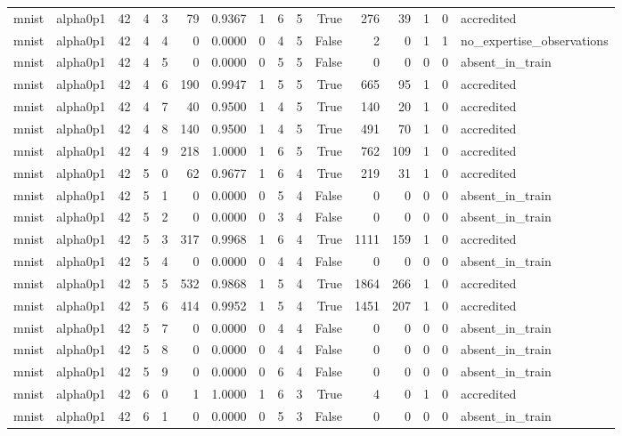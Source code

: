 \begin{tabular}{llrrrrrrrrrrrrrl}
mnist & alpha0p1 & 42 & 4 & 3 & 79 & 0.9367 & 1 & 6 & 5 & True & 276 & 39 & 1 & 0 & accredited \\
mnist & alpha0p1 & 42 & 4 & 4 & 0 & 0.0000 & 0 & 4 & 5 & False & 2 & 0 & 1 & 1 & no\_expertise\_observations \\
mnist & alpha0p1 & 42 & 4 & 5 & 0 & 0.0000 & 0 & 5 & 5 & False & 0 & 0 & 0 & 0 & absent\_in\_train \\
mnist & alpha0p1 & 42 & 4 & 6 & 190 & 0.9947 & 1 & 5 & 5 & True & 665 & 95 & 1 & 0 & accredited \\
mnist & alpha0p1 & 42 & 4 & 7 & 40 & 0.9500 & 1 & 4 & 5 & True & 140 & 20 & 1 & 0 & accredited \\
mnist & alpha0p1 & 42 & 4 & 8 & 140 & 0.9500 & 1 & 4 & 5 & True & 491 & 70 & 1 & 0 & accredited \\
mnist & alpha0p1 & 42 & 4 & 9 & 218 & 1.0000 & 1 & 6 & 5 & True & 762 & 109 & 1 & 0 & accredited \\
mnist & alpha0p1 & 42 & 5 & 0 & 62 & 0.9677 & 1 & 6 & 4 & True & 219 & 31 & 1 & 0 & accredited \\
mnist & alpha0p1 & 42 & 5 & 1 & 0 & 0.0000 & 0 & 5 & 4 & False & 0 & 0 & 0 & 0 & absent\_in\_train \\
mnist & alpha0p1 & 42 & 5 & 2 & 0 & 0.0000 & 0 & 3 & 4 & False & 0 & 0 & 0 & 0 & absent\_in\_train \\
mnist & alpha0p1 & 42 & 5 & 3 & 317 & 0.9968 & 1 & 6 & 4 & True & 1111 & 159 & 1 & 0 & accredited \\
mnist & alpha0p1 & 42 & 5 & 4 & 0 & 0.0000 & 0 & 4 & 4 & False & 0 & 0 & 0 & 0 & absent\_in\_train \\
mnist & alpha0p1 & 42 & 5 & 5 & 532 & 0.9868 & 1 & 5 & 4 & True & 1864 & 266 & 1 & 0 & accredited \\
mnist & alpha0p1 & 42 & 5 & 6 & 414 & 0.9952 & 1 & 5 & 4 & True & 1451 & 207 & 1 & 0 & accredited \\
mnist & alpha0p1 & 42 & 5 & 7 & 0 & 0.0000 & 0 & 4 & 4 & False & 0 & 0 & 0 & 0 & absent\_in\_train \\
mnist & alpha0p1 & 42 & 5 & 8 & 0 & 0.0000 & 0 & 4 & 4 & False & 0 & 0 & 0 & 0 & absent\_in\_train \\
mnist & alpha0p1 & 42 & 5 & 9 & 0 & 0.0000 & 0 & 6 & 4 & False & 0 & 0 & 0 & 0 & absent\_in\_train \\
mnist & alpha0p1 & 42 & 6 & 0 & 1 & 1.0000 & 1 & 6 & 3 & True & 4 & 0 & 1 & 0 & accredited \\
mnist & alpha0p1 & 42 & 6 & 1 & 0 & 0.0000 & 0 & 5 & 3 & False & 0 & 0 & 0 & 0 & absent\_in\_train \\

\end{tabular}
